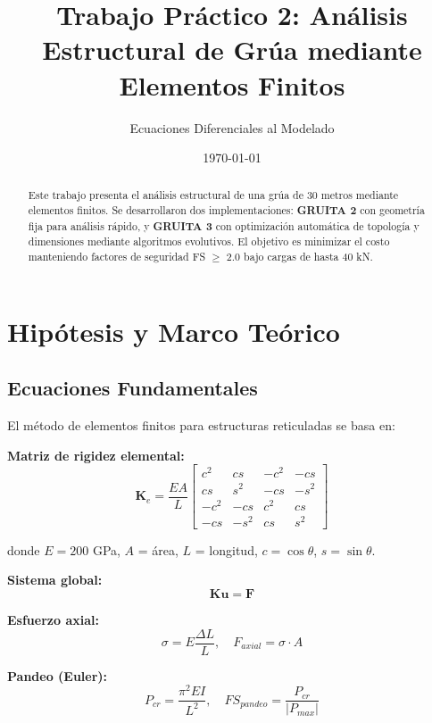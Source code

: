 \documentclass[10pt,a4paper]{article}
\title{\vspace{-1cm}\textbf{Trabajo Práctico 2: Análisis Estructural de Grúa mediante Elementos Finitos}}
\author{Ecuaciones Diferenciales al Modelado}
\date{\today}
\begin{document}
\maketitle
\vspace{-0.7cm}

\begin{abstract}
\small
Este trabajo presenta el análisis estructural de una grúa de 30 metros mediante elementos finitos. Se desarrollaron dos implementaciones: \textbf{GRUITA 2} con geometría fija para análisis rápido, y \textbf{GRUITA 3} con optimización automática de topología y dimensiones mediante algoritmos evolutivos. El objetivo es minimizar el costo manteniendo factores de seguridad FS $\geq$ 2.0 bajo cargas de hasta 40 kN.
\end{abstract}

\section{Hipótesis y Marco Teórico}

\subsection{Ecuaciones Fundamentales}

El método de elementos finitos para estructuras reticuladas se basa en:

\textbf{Matriz de rigidez elemental:}
\begin{equation}
\mathbf{K}_e = \frac{EA}{L} \begin{bmatrix}
c^2 & cs & -c^2 & -cs \\
cs & s^2 & -cs & -s^2 \\
-c^2 & -cs & c^2 & cs \\
-cs & -s^2 & cs & s^2
\end{bmatrix}
\end{equation}

donde $E = 200$ GPa, $A$ = área, $L$ = longitud, $c = \cos\theta$, $s = \sin\theta$.

\textbf{Sistema global:}
\begin{equation}
\mathbf{K}\mathbf{u} = \mathbf{F}
\end{equation}

\textbf{Esfuerzo axial:}
\begin{equation}
\sigma = E \frac{\Delta L}{L}, \quad F_{axial} = \sigma \cdot A
\end{equation}

\textbf{Pandeo (Euler):}
\begin{equation}
P_{cr} = \frac{\pi^2 EI}{L^2}, \quad FS_{pandeo} = \frac{P_{cr}}{|P_{max}|}
\end{equation}
\end{document}
